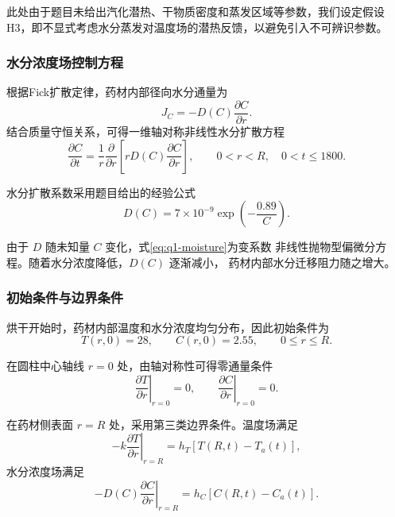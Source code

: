 \documentclass[12pt,a4paper]{article}
\renewcommand{\boxed}[1]{#1}
\begin{document}
此处由于题目未给出汽化潜热、干物质密度和蒸发区域等参数，我们设定假设H3，即不显式考虑水分蒸发对温度场的潜热反馈，以避免引入不可辨识参数。

\subsubsection{水分浓度场控制方程}

根据Fick扩散定律，药材内部径向水分通量为
\begin{equation}
J_C=-D(C)\frac{\partial C}{\partial r}.
\end{equation}
结合质量守恒关系，可得一维轴对称非线性水分扩散方程
\begin{equation}
\boxed{
\frac{\partial C}{\partial t}
=
\frac{1}{r}
\frac{\partial}{\partial r}
\left[
rD(C)\frac{\partial C}{\partial r}
\right]
},
\qquad
0<r<R,\quad 0<t\le1800.
\label{eq:q1-moisture}
\end{equation}

水分扩散系数采用题目给出的经验公式
\begin{equation}
\boxed{
D(C)
=
7\times10^{-9}
\exp\left(-\frac{0.89}{C}\right)
}.
\label{eq:q1-diffusivity}
\end{equation}

由于 $D$ 随未知量 $C$ 变化，式\eqref{eq:q1-moisture}为变系数
非线性抛物型偏微分方程。随着水分浓度降低，$D(C)$ 逐渐减小，
药材内部水分迁移阻力随之增大。

\subsubsection{初始条件与边界条件}

烘干开始时，药材内部温度和水分浓度均匀分布，因此初始条件为
\begin{equation}
\boxed{
T(r,0)=28,\qquad C(r,0)=2.55
},
\qquad 0\le r\le R.
\label{eq:q1-initial}
\end{equation}

在圆柱中心轴线 $r=0$ 处，由轴对称性可得零通量条件
\begin{equation}
\boxed{
\left.\frac{\partial T}{\partial r}\right|_{r=0}=0,
\qquad
\left.\frac{\partial C}{\partial r}\right|_{r=0}=0
}.
\label{eq:q1-center}
\end{equation}

在药材侧表面 $r=R$ 处，采用第三类边界条件。温度场满足
\begin{equation}
\boxed{
-k\left.\frac{\partial T}{\partial r}\right|_{r=R}
=
h_T\left[T(R,t)-T_a(t)\right]
},
\label{eq:q1-heat-bc}
\end{equation}
水分浓度场满足
\begin{equation}
\boxed{
-D(C)\left.\frac{\partial C}{\partial r}\right|_{r=R}
=
h_C\left[C(R,t)-C_a(t)\right]
}.
\label{eq:q1-moisture-bc}
\end{equation}
\end{document}
